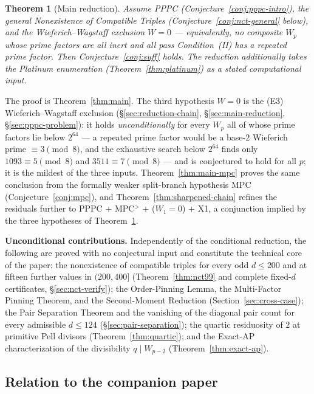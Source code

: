 \documentclass[11pt]{amsart}
\theoremstyle{plain}
\newtheorem{theorem}{Theorem}[section]
\theoremstyle{definition}
\theoremstyle{remark}
\numberwithin{equation}{section}
\begin{document}
\begin{theorem}[Main reduction]\label{thm:main-intro}
Assume PPPC (Conjecture~\ref{conj:pppc-intro}), the general Nonexistence of Compatible Triples (Conjecture~\ref{conj:nct-general} below), and the Wieferich--Wagstaff exclusion $W = 0$ --- equivalently, no composite $W_p$ whose prime factors are all inert and all pass Condition~(II) has a repeated prime factor. Then Conjecture~\ref{conj:suff} holds. The reduction additionally takes the Platinum enumeration (Theorem~\ref{thm:platinum}) as a stated computational input.
\end{theorem}

The proof is Theorem~\ref{thm:main}. The third hypothesis $W = 0$ is the (E3) Wieferich--Wagstaff exclusion (\S\ref{sec:reduction-chain}, \S\ref{sec:main-reduction}, \S\ref{sec:pppc-problem}): it holds \emph{unconditionally} for every $W_p$ all of whose prime factors lie below $2^{64}$ --- a repeated prime factor would be a base-$2$ Wieferich prime $\equiv 3 \pmod 8$, and the exhaustive search below $2^{64}$ finds only $1093\equiv5\pmod8$ and $3511\equiv7\pmod8$ \cite{ref:OEISWieferich} --- and is conjectured to hold for all $p$; it is the mildest of the three inputs. Theorem~\ref{thm:main-mpc} proves the same conclusion from the formally weaker split-branch hypothesis MPC (Conjecture~\ref{conj:mpc}), and Theorem~\ref{thm:sharpened-chain} refines the residuals further to PPPC + MPC$^{>}$ + ($W_1 = 0$) + X1, a conjunction implied by the three hypotheses of Theorem~\ref{thm:main-intro}.

\textbf{Unconditional contributions.} Independently of the conditional reduction, the following are proved with no conjectural input and constitute the technical core of the paper: the nonexistence of compatible triples for every odd $d \leq 200$ and at fifteen further values in $(200, 400]$ (Theorem~\ref{thm:nct99} and complete fixed-$d$ certificates, \S\ref{sec:nct-verify}); the Order-Pinning Lemma, the Multi-Factor Pinning Theorem, and the Second-Moment Reduction (Section~\ref{sec:cross-case}); the Pair Separation Theorem and the vanishing of the diagonal pair count for every admissible $d \leq 124$ (\S\ref{sec:pair-separation}); the quartic residuosity of $2$ at primitive Pell divisors (Theorem~\ref{thm:quartic}); and the Exact-AP characterization of the divisibility $q \mid W_{p-2}$ (Theorem~\ref{thm:exact-ap}).

\subsection{Relation to the companion paper}
\end{document}

